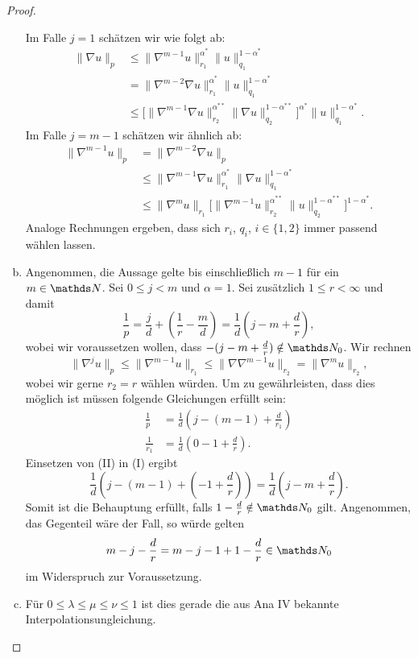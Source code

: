 \begin{proof}
\begin{enumerate}[a)]
      Im Falle $j = 1$ schätzen wir wie folgt ab:
      \begin{align*}
        \| \nabla u\|_p &\leq \|\nabla^{m - 1} u\|_{r_1}^{\alpha^*} \|u\|_{q_1}^{1 - \alpha^*} \\
        &= \|\nabla^{m - 2} \nabla u \|_{r_1}^{\alpha^*} \|u\|_{q_1}^{1 - \alpha^*} \\
        &\leq \Big[ \|\nabla^{m - 1} \nabla u\|_{r_2}^{\alpha^{**}} \|\nabla u\|_{q_2}^{1 - \alpha^{**}} \Big]^{\alpha^*} \|u\|_{q_1}^{1 - \alpha^*}.
      \end{align*}
      Im Falle $j = m - 1$ schätzen wir ähnlich ab:
      \begin{align*}
        \| \nabla^{m - 1} u\|_p 
        &= \|\nabla^{m - 2} \nabla u \|_p \\
        &\leq \|\nabla^{m - 1} \nabla u\|_{r_1}^{\alpha^*} \|\nabla u\|_{q_1}^{1 - \alpha^*} \\
        &\leq \|\nabla^{m } u\|_{r_1} \Big[ \|\nabla^{m - 1} u\|_{r_2}^{\alpha^{**}} \|u\|_{q_2}^{1 - \alpha^{**}} \Big]^{1 - \alpha^*}.
\end{align*}
Analoge Rechnungen ergeben, dass sich $r_i$, $q_i$, $i \in \{1,2\}$ immer passend wählen lassen.
    \item Angenommen, die Aussage gelte bis einschließlich $m - 1$ für ein $m \in \N$. Sei $0 \leq j < m $ und $\alpha = 1$. 
      Sei zusätzlich $1 \leq r < \infty$ und damit
      $$
      \frac{1}{p} = \frac{j}{d} + (\frac{1}{r} - \frac{m}{d}) = \frac{1}{d} ( j - m + \frac{d}{r}),
      $$
      wobei wir voraussetzen wollen, dass $-(j - m + \frac{d}{r}) \notin \N_0$.
      Wir rechnen
      $$
      \|\nabla^j u\|_p \leq  \|\nabla^{m - 1} u\|_{r_1} \leq \|\nabla \nabla^{m - 1} u\|_{r_2} = \|\nabla^m u\|_{r_2},
      $$
      wobei wir gerne $r_2 = r$ wählen würden.
      Um zu gewährleisten, dass dies möglich ist müssen folgende Gleichungen erfüllt sein:
      \begin{align*}
        \frac{1}{p} &= \frac{1}{d}( j - (m - 1) + \frac{d}{r_1} ) \tag{I} \\
        \frac{1}{r_1} &= \frac{1}{d} ( 0 - 1 + \frac{d}{r} ) \tag{II}.
      \end{align*}
      Einsetzen von (II) in (I) ergibt
      $$
      \frac{1}{d}( j - (m - 1) + (- 1 + \frac{d}{r})) = \frac{1}{d} (j - m + \frac{d}{r}).
      $$
      Somit ist die Behauptung erfüllt, falls $1 - \frac{d}{r} \notin \N_0$ gilt. Angenommen, das Gegenteil wäre der Fall, so würde gelten
      $$
      m - j - \frac{d}{r} = m - j - 1 + 1 - \frac{d}{r} \in \N_0
      $$
      im Widerspruch zur Voraussetzung.

    \item Für $0 \leq \lambda \leq \mu \leq \nu \leq 1$ ist dies gerade die aus Ana IV bekannte Interpolationsungleichung.
  \end{enumerate}


\end{proof}

